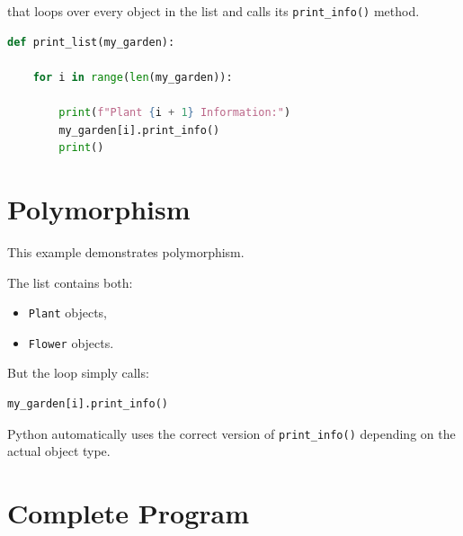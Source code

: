 \documentclass[11pt]{article}
\begin{document}
that loops over every object in the list and calls its \texttt{print\_info()} method.

\begin{lstlisting}[language=Python]
def print_list(my_garden):

    for i in range(len(my_garden)):

        print(f"Plant {i + 1} Information:")
        my_garden[i].print_info()
        print()
\end{lstlisting}

\section{Polymorphism}

This example demonstrates polymorphism.

The list contains both:

\begin{itemize}
    \item \texttt{Plant} objects,
    \item \texttt{Flower} objects.
\end{itemize}

But the loop simply calls:

\begin{lstlisting}[language=Python]
my_garden[i].print_info()
\end{lstlisting}

Python automatically uses the correct version of \texttt{print\_info()} depending on the actual object type.

\section{Complete Program}
\end{document}
